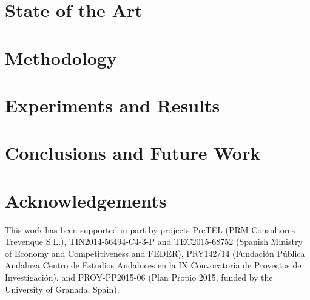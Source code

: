 \documentclass[a4paper,10pt,onecolumn,preprint,3p]{elsarticle}
\begin{document}
\section{State of the Art}
\label{sec:sota}


\section{Methodology}
\label{sec:methodology}


\section{Experiments and Results}
\label{sec:experiments_results}


\section{Conclusions and Future Work}
\label{sec:conclusions}





\section*{Acknowledgements}

This work has been supported in part by projects PreTEL (PRM Consultores - Trevenque S.L.), TIN2014-56494-C4-3-P and TEC2015-68752 (Spanish Ministry of Economy and Competitiveness and FEDER), PRY142/14 (Fundaci{\'o}n P{\'u}blica Andaluza Centro de Estudios Andaluces en la IX Convocatoria de Proyectos de Investigaci{\'o}n), and PROY-PP2015-06 (Plan Propio 2015, funded by the University of Granada, Spain).





\end{document}
